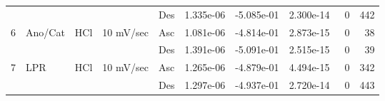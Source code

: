 \begin{tabular}{lllllrrrlr}
  &     &     &           & Des &              1.335e-06 &                -5.085e-01 &             2.300e-14 &                             ~0 &  442 \\
6 & Ano/Cat & HCl & 10 mV/sec & Asc &              1.081e-06 &                -4.814e-01 &             2.873e-15 &                             ~0 &   38 \\
  &     &     &           & Des &              1.391e-06 &                -5.091e-01 &             2.515e-15 &                             ~0 &   39 \\
7 & LPR & HCl & 10 mV/sec & Asc &              1.265e-06 &                -4.879e-01 &             4.494e-15 &                             ~0 &  342 \\
  &     &     &           & Des &              1.297e-06 &                -4.937e-01 &             2.720e-14 &                             ~0 &  443 \\
\bottomrule
\end{tabular}
